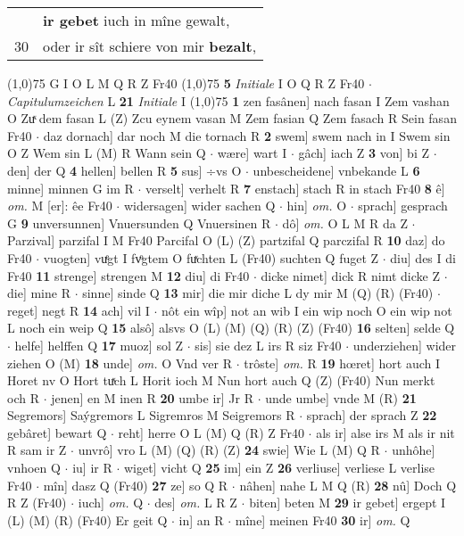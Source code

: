 \documentclass[8pt,a4paper,notitlepage]{article}
\begin{document}
\begin{table}[ht]
\begin{minipage}[t]{0.5\linewidth}
\begin{tabular}{rl}
 & \textbf{ir gebet} iuch in mîne gewalt,\\ 
30 & oder ir sît schiere von mir \textbf{bezalt},\\ 
\end{tabular}
\scriptsize
\line(1,0){75} \newline
G I O L M Q R Z Fr40 \newline
\line(1,0){75} \newline
\textbf{5} \textit{Initiale} I O Q R Z Fr40   $\cdot$ \textit{Capitulumzeichen} L  \textbf{21} \textit{Initiale} I  \newline
\line(1,0){75} \newline
\textbf{1} zen fasânen] nach fasan I Zem vashan O Zuͯ dem fasan L (Z) Zcu eynem vasan M Zem fasian Q Zem fasach R Sein fasan Fr40  $\cdot$ daz dornach] dar noch M die tornach R \textbf{2} swem] swem nach in I Swem sin O Z Wem sin L (M) R Wann sein Q  $\cdot$ wære] wart I  $\cdot$ gâch] iach Z \textbf{3} von] bi Z  $\cdot$ den] der Q \textbf{4} hellen] bellen R \textbf{5} sus] ÷vs O  $\cdot$ unbescheidene] vnbekande L \textbf{6} minne] minnen G im R  $\cdot$ verselt] verhelt R \textbf{7} enstach] stach R in stach Fr40 \textbf{8} ê] \textit{om.} M [er]: êe Fr40  $\cdot$ widersagen] wider sachen Q  $\cdot$ hin] \textit{om.} O  $\cdot$ sprach] gesprach G \textbf{9} unversunnen] Vnuersunden Q Vnuersinen R  $\cdot$ dô] \textit{om.} O L M R da Z  $\cdot$ Parzival] parzifal I M Fr40 Parcifal O (L) (Z) partzifal Q parczifal R \textbf{10} daz] do Fr40  $\cdot$ vuogten] vuͤgt I fvͦgtem O fuͯchten L (Fr40) suchten Q fuget Z  $\cdot$ diu] des I di Fr40 \textbf{11} strenge] strengen M \textbf{12} diu] di Fr40  $\cdot$ dicke nimet] dick R nimt dicke Z  $\cdot$ die] mine R  $\cdot$ sinne] sinde Q \textbf{13} mir] die mir diche L dy mir M (Q) (R) (Fr40)  $\cdot$ reget] negt R \textbf{14} ach] vil I  $\cdot$ nôt ein wîp] not an wib I ein wip noch O ein wip not L noch ein weip Q \textbf{15} alsô] alsvs O (L) (M) (Q) (R) (Z) (Fr40) \textbf{16} selten] selde Q  $\cdot$ helfe] helffen Q \textbf{17} muoz] sol Z  $\cdot$ sis] sie dez L irs R siz Fr40  $\cdot$ underziehen] wider ziehen O (M) \textbf{18} unde] \textit{om.} O Vnd ver R  $\cdot$ trôste] \textit{om.} R \textbf{19} hœret] hort auch I Horet nv O Hort tuͯch L Horit ioch M Nun hort auch Q (Z) (Fr40) Nun merkt och R  $\cdot$ jenen] en M inen R \textbf{20} umbe ir] Jr R  $\cdot$ unde umbe] vnde M (R) \textbf{21} Segremors] Saýgremors L Sigremros M Seigremors R  $\cdot$ sprach] der sprach Z \textbf{22} gebâret] bewart Q  $\cdot$ reht] herre O L (M) Q (R) Z Fr40  $\cdot$ als ir] alse irs M als ir nit R sam ir Z  $\cdot$ unvrô] vro L (M) (Q) (R) (Z) \textbf{24} swie] Wie L (M) Q R  $\cdot$ unhôhe] vnhoen Q  $\cdot$ iu] ir R  $\cdot$ wiget] vicht Q \textbf{25} im] ein Z \textbf{26} verliuse] verliese L verlise Fr40  $\cdot$ mîn] dasz Q (Fr40) \textbf{27} ze] so Q R  $\cdot$ nâhen] nahe L M Q (R) \textbf{28} nû] Doch Q R Z (Fr40)  $\cdot$ iuch] \textit{om.} Q  $\cdot$ des] \textit{om.} L R Z  $\cdot$ biten] beten M \textbf{29} ir gebet] ergept I (L) (M) (R) (Fr40) Er geit Q  $\cdot$ in] an R  $\cdot$ mîne] meinen Fr40 \textbf{30} ir] \textit{om.} Q \newline

\end{minipage}
\end{table}
\end{document}
